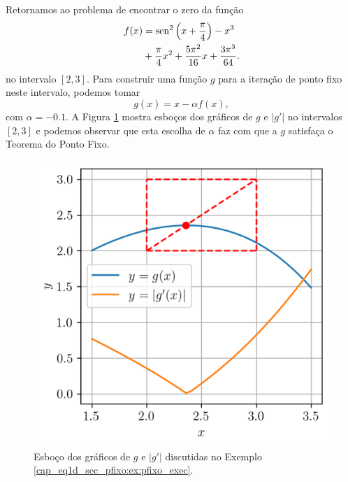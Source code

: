 \begin{ex}\label{cap_eq1d_sec_pfixo:ex:pfixo_exec}
  Retornamos ao problema de encontrar o zero da função
  \begin{equation}
\begin{aligned}
      f(x) &= \operatorname{sen}^2\left(x+\frac{\pi}{4}\right) - x^3 \\
      &+ \frac{\pi}{4}x^2 + \frac{5\pi^2}{16}x + \frac{3\pi^3}{64}.
\end{aligned}  
\end{equation}
  no intervalo $[2, 3]$. Para construir uma função $g$ para a iteração de ponto fixo neste intervalo, podemos tomar
  \begin{equation}
    g(x) = x - \alpha f(x),
  \end{equation}
com $\alpha = -0.1$. A Figura \ref{cap_eq1d_sec_pfixo:fig:ex_pfixo_exec} mostra esboços dos gráficos de $g$ e $|g'|$ no intervalos $[2, 3]$ e podemos observar que esta escolha de $\alpha$ faz com que a $g$ satisfaça o Teorema do Ponto Fixo.

\begin{figure}[H]
  \centering
  \includegraphics[width=\textwidth]{./cap_eq1d/dados/fig_ex_pfixo_exec/fig}
  \caption{Esboço dos gráficos de $g$ e $|g'|$ discutidas no Exemplo \ref{cap_eq1d_sec_pfixo:ex:pfixo_exec}.}
  \label{cap_eq1d_sec_pfixo:fig:ex_pfixo_exec}
\end{figure}


\end{ex}
